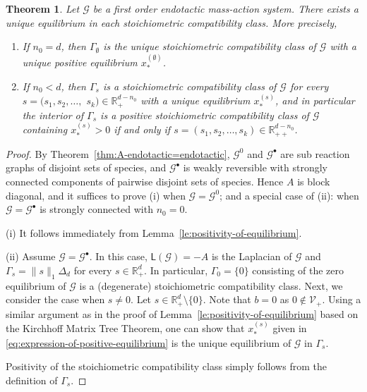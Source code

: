 \documentclass[10pt]{amsart}
\numberwithin{equation}{section}
\theoremstyle{plain}
\newtheorem{theorem}{Theorem}[section]
\theoremstyle{definition}
\theoremstyle{remark}
\newcommand{\cG}{\mathcal{G}}
\newcommand{\cV}{\mathcal{V}}
\begin{document}
\begin{theorem}\label{thm:exisitence-of-positive-equilibrium}
Let $\cG$ be a first order endotactic mass-action system. There exists a unique equilibrium in each stoichiometric compatibility class. More precisely,
\begin{enumerate}
\item[(i)]  If $n_0=d$, then $\Gamma_{\emptyset}$ is the unique  stoichiometric compatibility class of  $\cG$ with a unique positive equilibrium $x_*^{(\emptyset)}$.
\item[(ii)] If $n_0<d$, then $\Gamma_s$ is a  stoichiometric compatibility class of  $\cG$ for every $s=(s_1,s_2,\ldots,$ $s_k)\in\mathbb{R}^{d-n_0}_{+}$ with a unique equilibrium $x_*^{(s)}$, and in particular the interior of $\Gamma_s$ is a positive stoichiometric compatibility class of  $\cG$ containing $x_*^{(s)}>0$ if and only if $s=(s_1,s_2,\ldots,s_k)\in\mathbb{R}^{d-n_0}_{++}$.
\end{enumerate}
 \end{theorem}
\begin{proof}

By Theorem~\ref{thm:A-endotactic=endotactic}, $\cG^0$ and $\cG^{\bullet}$ are sub reaction graphs of disjoint sets of species, and $\cG^{\bullet}$ is 
 weakly reversible with strongly connected components of pairwise disjoint sets of species. Hence $A$ is block diagonal, and it suffices to prove (i) when $\cG=\cG^0$; 
  and a special case of (ii):   
when  $\cG=\cG^{\bullet}$ is strongly connected with $n_0=0$.
\medskip

\noindent(i) It follows immediately from Lemma~\ref{le:positivity-of-equilibrium}.
\medskip

\noindent(ii) Assume $\cG=\cG^{\bullet}$. In this case, $\mathsf{L}(\cG)=-A$ is the Laplacian of $\cG$ and $\Gamma_s=\|s\|_1\Delta_d$ for every $s\in\mathbb{R}^d_+$. In particular, 
$\Gamma_0=\{0\}$ consisting of the zero equilibrium of $\cG$ is a (degenerate) stoichiometric compatibility class.   Next, we consider the case when $s\neq0$. 
Let $s\in\mathbb{R}^d_+\setminus\{0\}$. Note that  $b=0$ as $0\notin\cV_+$. 
Using a similar argument as in the proof of Lemma~\ref{le:positivity-of-equilibrium} based on the Kirchhoff Matrix Tree Theorem, one can show that $x_*^{(s)}$ given in \eqref{eq:expression-of-positive-equilibrium}  is  the unique equilibrium of $\cG$ in $\Gamma_s$.

 Positivity of the stoichiometric compatibility class simply  follows from the definition of $\Gamma_s$.
\end{proof}
\end{document}
